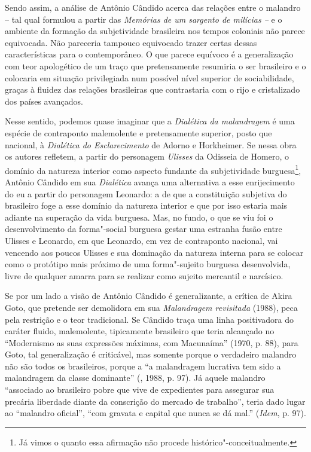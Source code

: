 Sendo assim, a análise de Antônio Cândido acerca das relações entre o
malandro -- tal qual formulou a partir das \emph{Memórias de um sargento
de milícias --} e o ambiente da formação da subjetividade brasileira nos
tempos coloniais não parece equivocada. Não pareceria tampouco
equivocado trazer certas dessas características para o contemporâneo. O
que parece equívoco é a generalização com teor apologético de um traço
que pretensamente resumiria o ser brasileiro e o colocaria em situação
privilegiada num possível nível superior de sociabilidade, graças à
fluidez das relações brasileiras que contrastaria com o rijo e
cristalizado dos países avançados.

Nesse sentido, podemos quase imaginar que a \emph{Dialética da
malandragem} é uma espécie de contraponto malemolente e pretensamente
superior, posto que nacional, à \emph{Dialética do Esclarecimento} de
Adorno e Horkheimer. Se nessa obra os autores refletem, a partir do
personagem \emph{Ulisses} da Odisseia de Homero, o domínio da natureza
interior como aspecto fundante da subjetividade burguesa\footnote{Já vimos
o quanto essa afirmação não procede histórico"-conceitualmente.}, Antônio
Cândido em sua \emph{Dialética} avança uma alternativa a esse
enrijecimento do eu a partir do personagem Leonardo: a de que a
constituição subjetiva do brasileiro foge a esse domínio da natureza
interior e que por isso estaria mais adiante na superação da vida
burguesa. Mas, no fundo, o que se viu foi o desenvolvimento da
forma"-social burguesa gestar uma estranha fusão entre Ulisses e
Leonardo, em que Leonardo, em vez de contraponto nacional, vai vencendo
aos poucos Ulisses e sua dominação da natureza interna para se colocar
como o protótipo mais próximo de uma forma"-sujeito burguesa
desenvolvida, livre de qualquer amarra para se realizar como sujeito
mercantil e narcísico.

Se por um lado a visão de Antônio Cândido é generalizante, a crítica de
Akira Goto, que pretende ser demolidora em sua \emph{Malandragem
revisitada} (1988), peca pela restrição e o teor tradicional. Se Cândido
traça uma linha positivadora do caráter fluido, malemolente, tipicamente
brasileiro que teria alcançado no ``Modernismo as suas expressões
máximas, com Macunaíma'' (1970, p. 88), para Goto, tal generalização é
criticável, mas somente porque o verdadeiro malandro não são todos os
brasileiros, porque a ``a malandragem lucrativa tem sido a malandragem
da classe dominante'' (, 1988, p. 97). Já aquele malandro
``associado ao brasileiro pobre que vive de expedientes para assegurar
sua precária liberdade diante da conscrição do mercado de trabalho'',
teria dado lugar ao ``malandro oficial'', ``com gravata e capital que
nunca se dá mal.'' (\emph{Idem}, p. 97).

